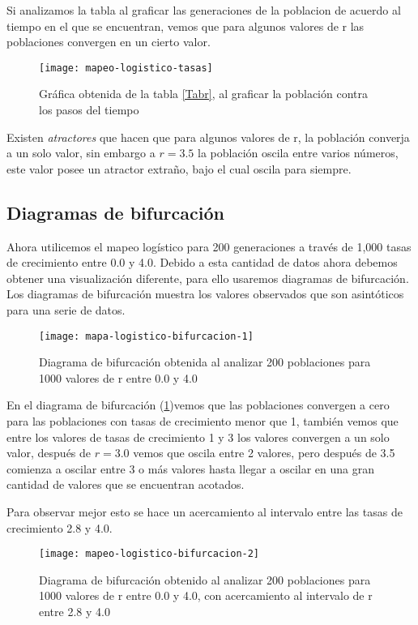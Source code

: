 Si analizamos la tabla al graficar las generaciones de la poblacion de acuerdo al tiempo en el que se encuentran, vemos que para algunos valores de r las poblaciones convergen en un cierto valor.

\begin{figure}[ht!]
\centering
\texttt{[image: mapeo-logistico-tasas]}
\caption{Gráfica obtenida de la tabla \ref{Tabr}, al graficar la población contra los pasos del tiempo}
\end{figure}

Existen \textit{atractores} que hacen que para algunos valores de r, la población converja a un solo valor, sin embargo a $r=3.5$ la población oscila entre varios números, este valor posee un atractor extraño, bajo el cual oscila para siempre.

\subsection{Diagramas de bifurcación }
Ahora utilicemos el mapeo logístico para 200 generaciones a través de 1,000 tasas de crecimiento entre 0.0 y 4.0. Debido a esta cantidad de datos ahora debemos obtener una visualización diferente, para ello usaremos diagramas de bifurcación. Los diagramas de bifurcación muestra los valores observados que son asintóticos para una serie de datos. \cite{bifu}

\begin{figure}[ht!]
\centering
\texttt{[image: mapa-logistico-bifurcacion-1]}
\caption{Diagrama de bifurcación obtenida al analizar 200 poblaciones para 1000 valores de r entre 0.0 y 4.0}
\label{bif1}
\end{figure}

En el diagrama de bifurcación (\ref{bif1})vemos que las poblaciones convergen a cero para las poblaciones con tasas de crecimiento menor que 1, también vemos que entre los valores de tasas de crecimiento 1 y 3 los valores convergen a un solo valor, después de $r=3.0$ vemos que oscila entre 2 valores, pero después de 3.5 comienza a oscilar entre 3 o más valores hasta llegar a oscilar en una gran cantidad de valores que se encuentran acotados.

Para observar mejor esto se hace un acercamiento al intervalo entre las tasas de crecimiento 2.8 y 4.0.

\begin{figure}[ht!]
\centering
\texttt{[image: mapeo-logistico-bifurcacion-2]}
\caption{Diagrama de bifurcación obtenido al analizar 200 poblaciones para 1000 valores de r entre 0.0 y 4.0, con acercamiento al intervalo de r entre 2.8 y 4.0}
\label{bif2}
\end{figure}

